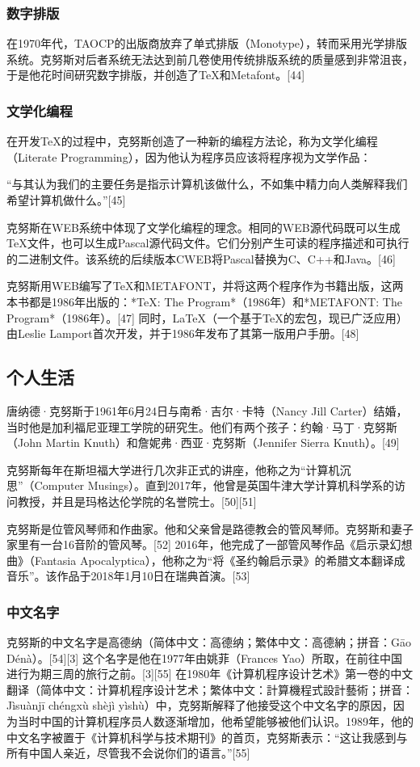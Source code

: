 \subsubsection{数字排版}
在1970年代，TAOCP的出版商放弃了单式排版（Monotype），转而采用光学排版系统。克努斯对后者系统无法达到前几卷使用传统排版系统的质量感到非常沮丧，于是他花时间研究数字排版，并创造了TeX和Metafont。[44]
\subsubsection{文学化编程}
在开发TeX的过程中，克努斯创造了一种新的编程方法论，称为文学化编程（Literate Programming），因为他认为程序员应该将程序视为文学作品：

“与其认为我们的主要任务是指示计算机该做什么，不如集中精力向人类解释我们希望计算机做什么。”[45]

克努斯在WEB系统中体现了文学化编程的理念。相同的WEB源代码既可以生成TeX文件，也可以生成Pascal源代码文件。它们分别产生可读的程序描述和可执行的二进制文件。该系统的后续版本CWEB将Pascal替换为C、C++和Java。[46]

克努斯用WEB编写了TeX和METAFONT，并将这两个程序作为书籍出版，这两本书都是1986年出版的：*TeX: The Program*（1986年）和*METAFONT: The Program*（1986年）。[47] 同时，LaTeX（一个基于TeX的宏包，现已广泛应用）由Leslie Lamport首次开发，并于1986年发布了其第一版用户手册。[48]
\subsection{个人生活}
唐纳德·克努斯于1961年6月24日与南希·吉尔·卡特（Nancy Jill Carter）结婚，当时他是加利福尼亚理工学院的研究生。他们有两个孩子：约翰·马丁·克努斯（John Martin Knuth）和詹妮弗·西亚·克努斯（Jennifer Sierra Knuth）。[49]

克努斯每年在斯坦福大学进行几次非正式的讲座，他称之为“计算机沉思”（Computer Musings）。直到2017年，他曾是英国牛津大学计算机科学系的访问教授，并且是玛格达伦学院的名誉院士。[50][51]

克努斯是位管风琴师和作曲家。他和父亲曾是路德教会的管风琴师。克努斯和妻子家里有一台16音阶的管风琴。[52] 2016年，他完成了一部管风琴作品《启示录幻想曲》（Fantasia Apocalyptica），他称之为“将《圣约翰启示录》的希腊文本翻译成音乐”。该作品于2018年1月10日在瑞典首演。[53]
\subsubsection{中文名字}
克努斯的中文名字是高德纳（简体中文：高德纳；繁体中文：高德納；拼音：Gāo Dénà）。[54][3] 这个名字是他在1977年由姚菲（Frances Yao）所取，在前往中国进行为期三周的旅行之前。[3][55] 在1980年《计算机程序设计艺术》第一卷的中文翻译（简体中文：计算机程序设计艺术；繁体中文：計算機程式設計藝術；拼音：Jìsuànjī chéngxù shèjì yìshù）中，克努斯解释了他接受这个中文名字的原因，因为当时中国的计算机程序员人数逐渐增加，他希望能够被他们认识。1989年，他的中文名字被置于《计算机科学与技术期刊》的首页，克努斯表示：“这让我感到与所有中国人亲近，尽管我不会说你们的语言。”[55]
